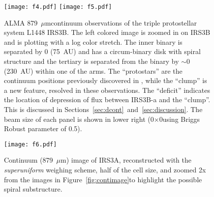 \documentclass[twocolumn, 12pt]{aastex63}
\renewcommand{\micron}{$\mu$m}
\newcommand{\ab}{$\sim$}
\newcommand{\contbeam}{0\farcs11$\times$0\farcs05}
\begin{document}
\begin{figure}[H]
\begin{center}
   \texttt{[image: f4.pdf]}
   \texttt{[image: f5.pdf]}
\end{center}
   \caption{ALMA 879~\micron\space continuum observations of the triple protostellar system L1448 IRS3B. The left colored image is zoomed in on IRS3B and is plotting with a log color stretch. The inner binary is separated by 0 (75~AU) and has a circum-binary disk with spiral structure and the tertiary is separated from the binary by \ab0 (230~AU) within one of the arms. The ``protostars'' are the continuum positions previously discovered in \citet{2016Natur.538..483T}, while the ``clump'' is a new feature, resolved in these observations. The ``deficit'' indicates the location of depression of flux between IRS3B-a and the ``clump''. This is discussed in Sections~\ref{sec:dcont}~and~\ref{sec:discussion}. The beam size of each panel is shown in lower right (\contbeam\space using Briggs Robust parameter of 0.5).}\label{fig:zoomincont}
\end{figure}


\begin{figure}[H]
  \begin{center}
   \texttt{[image: f6.pdf]}
   \end{center}
   \caption{Continuum (879~\micron) image of IRS3A, reconstructed with the \textit{superuniform} weighing scheme, half of the cell size, and zoomed 2x from the images in Figure~\ref{fig:contimage}\space to highlight the possible spiral substructure.} \label{fig:widesuperuniform}
\end{figure}
\end{document}
